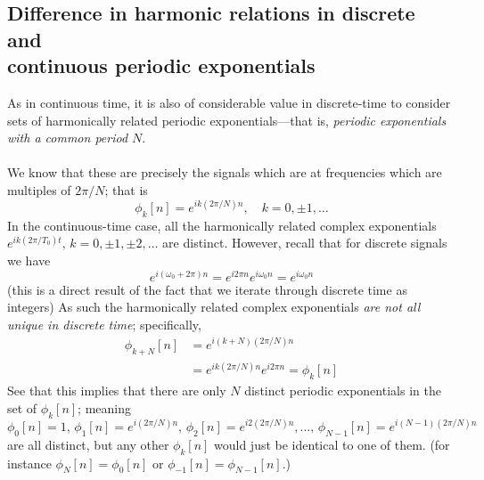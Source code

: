 \documentclass{report}
\begin{document}
\subsection{Difference in harmonic relations in discrete and\\continuous periodic exponentials}
As in continuous time, it is also of considerable value in discrete-time to consider sets of harmonically related
periodic exponentials---that is, \textit{periodic exponentials with a common period $N$}.\\
\vspace{1mm}\\
We know that these are precisely the signals which are at frequencies which are multiples of $2\pi/N$; that is
\begin{equation*}
\phi_k[n]=e^{ik(2\pi/N)n},\quad k=0,\pm1,\ldots
\end{equation*}
In the continuous-time case, all the harmonically related complex exponentials 
$e^{ik(2\pi/T_0)t},\,k=0,\pm1,\pm2,\ldots$ are distinct.
However, recall that for discrete signals we have
\begin{equation*}
e^{i(\omega_0+2\pi)n}=e^{i2\pi n}e^{i\omega_0n}=e^{i\omega_0n}
\end{equation*}
(this is a direct result of the fact that we iterate through discrete time as integers) As such the harmonically
related complex exponentials \textit{are not all unique in discrete time}; specifically,
\begin{align*}
\phi_{k+N}[n]&=e^{i(k+N)(2\pi/N)n}\\
&=e^{ik(2\pi/N)n}e^{i2\pi n}=\phi_k[n]
\end{align*}
See that this implies that there are only $N$ distinct 
periodic exponentials in the set of $\phi_k[n]$; meaning
\begin{equation*}
\phi_0[n]=1,\,\phi_1[n]=e^{i(2\pi/N)n},\,
\phi_2[n]=e^{i2(2\pi/N)n},\ldots,\,
\phi_{N-1}[n]=e^{i(N-1)(2\pi/N)n}
\end{equation*}
are all distinct, but any other $\phi_k[n]$ would just be identical to one of them. (for instance $\phi_N[n]=\phi_0[n]$ or $\phi_{-1}[n]=\phi_{N-1}[n]$.)
\newpage
\end{document}

